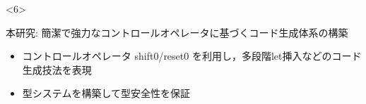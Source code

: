 \begin{frame}
  \begin{uncoverenv}<6>
    \begin{block}{本研究: 簡潔で強力なコントロールオペレータに基づくコード生成体系の構築}
      \begin{itemize}
      \item コントロールオペレータ shift0/reset0 を利用し，多段階let挿入などのコード生成技法を表現
      \item 型システムを構築して型安全性を保証
      \end{itemize}
    \end{block}
  \end{uncoverenv}

\end{frame}








